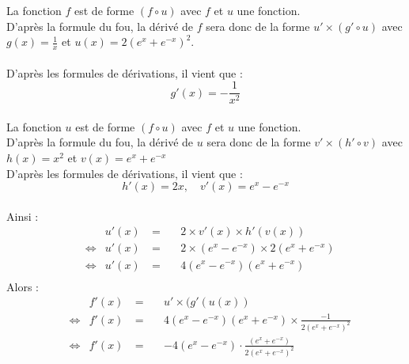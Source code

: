 \documentclass[a4paper,fleqn]{article}
\date{\today}
\begin{document}
La fonction $f$ est de forme $(f \circ u)$ avec $f$ et $u$ une fonction. \\
D'après la formule du fou, la dérivé de $f$ sera donc de la forme $u'\times(g' \circ u)$ avec $g(x) = \frac{1}{x}$ et $u(x) = 2(e^x+e^{-x})^2$. \\ \\
D'après les formules de dérivations, il vient que :
$$ g'(x)=-\frac{1}{x^2} $$ \\
La fonction $u$ est de forme $(f \circ u)$ avec $f$ et $u$ une fonction. \\
D'après la formule du fou, la dérivé de $u$ sera donc de la forme $v'\times(h' \circ v)$ avec $h(x) = x^2$ et $v(x) = e^x+e^{-x}$ \\
D'après les formules de dérivations, il vient que :
$$h'(x) = 2x,\quad v'(x) = e^x-e^{-x} $$ \\
Ainsi :
\begin{align*}
	&               & u'(x) &~=~&& 2 \times v'(x) \times h'(v(x)) \\ 
	&\Leftrightarrow& u'(x) &~=~&& 2 \times (e^x-e^{-x}) \times 2(e^x+e^{-x}) \\
	&\Leftrightarrow& u'(x) &~=~&& 4(e^x-e^{-x})(e^x+e^{-x}) \\
\end{align*}
Alors :
\begin{align*}
	&               & f'(x) &~=~&& u'\times(g'(u(x)) \\
	&\Leftrightarrow& f'(x) &~=~&& 4(e^x-e^{-x})(e^x+e^{-x}) \times \frac{-1}{2(e^x+e^{-x})^2} \\ 
	&\Leftrightarrow& f'(x) &~=~&& -4(e^x-e^{-x}) \cdot \frac{(e^x+e^{-x})}{2(e^x+e^{-x})^2} \\ 
\end{align*}
\end{document}
